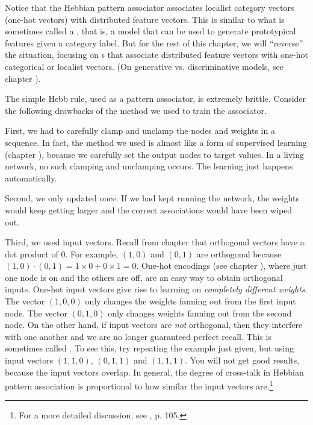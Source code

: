 Notice that the Hebbian pattern associator associates localist category vectors (one-hot vectors) with distributed feature vectors. This is similar to what is sometimes called a , that is, a model that can be used to generate prototypical features given a category label.  But for the rest of this chapter, we will ``reverse'' the situation, focusing on s that associate distributed feature vectors with one-hot categorical or localist vectors. (On generative vs. discriminative models, see chapter ).

The simple Hebb rule, used as a pattern associator, is extremely brittle. Consider the following drawbacks of the method we used to train the associator.

First, we had to carefully clamp and unclamp the nodes and weights in a sequence. In fact, the method we used is almost like a form of supervised learning (chapter ), because we carefully set the output nodes to target values. In a living network, no such clamping and unclamping occurs. The learning just happens automatically. 

Second, we only updated once. If we had kept running the network, the weights would keep getting larger and the correct associations would have been wiped out. 

Third, we used  input vectors. Recall from chapter  that orthogonal vectors have a dot product of 0. For example, $(1,0)$ and $(0,1)$ are orthogonal because $(1,0) \cdot (0,1) = 1 \times 0 + 0 \times 1 = 0$. One-hot encodings (see chapter ), where just one node is on and the others are off, are an easy way to obtain orthogonal inputs. One-hot input vectors give rise to learning on \emph{completely different weights}. The vector $(1,0,0)$ only changes the weights fanning out from the first input node. The  vector $(0,1,0)$ only changes weights fanning out from the second node. On the other hand, if input vectors are {\em not} orthogonal, then they interfere with one another and we are no longer guaranteed perfect recall. This is sometimes called . To see this, try repeating the example just given, but using input vectors $(1,1,0)$, $(0,1,1)$ and $(1,1,1)$. You will not get good results, because the input vectors overlap. In general, the degree of cross-talk in Hebbian pattern association  is proportional to how similar the input vectors are.\footnote{For a more detailed discussion, see \cite{fausett1994fundamentals}, p. 105.}

